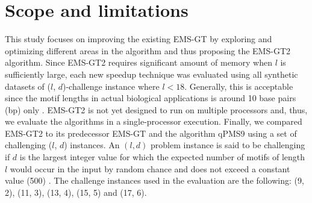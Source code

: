 \section{Scope and limitations}

This study focuses on improving the existing EMS-GT by exploring and optimizing different areas in the algorithm and thus proposing the EMS-GT2 algorithm. Since EMS-GT2 requires significant amount of memory when $l$ is sufficiently large, each new speedup technique was evaluated using all synthetic datasets of ($l$, $d$)-challenge instance where $l < 18$. Generally, this is acceptable since the motif lengths in actual biological applications is around 10 base pairs (bp) only \cite{stewart2012transcription}. EMS-GT2 is not yet designed to run on multiple processors and, thus, we evaluate the algorithms in a single-processor execution. Finally, we compared EMS-GT2 to its predecessor EMS-GT and the algorithm qPMS9 using a set of challenging ($l$, $d$) instances. An $(l, d)$ problem instance is said to be challenging if $d$ is the largest integer value for which the expected number of motifs of length $l$ would occur in the input by random chance and does not exceed a constant value (500) \cite{pms2015}. The challenge instances used in the evaluation are the following: (9, 2), (11, 3), (13, 4), (15, 5) and (17, 6).

